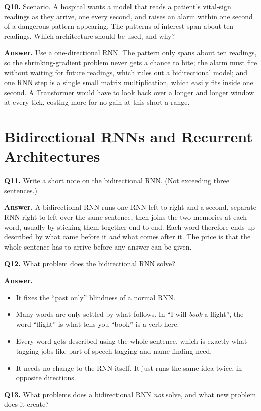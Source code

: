 \documentclass[11pt]{article}
\begin{document}
\medskip
\textbf{Q10.} Scenario. A hospital wants a model that reads a patient's vital-sign readings as
they arrive, one every second, and raises an alarm within one second of a dangerous pattern
appearing. The patterns of interest span about ten readings. Which architecture should be
used, and why?

\textbf{Answer.} Use a one-directional RNN. The pattern only spans about ten readings, so the
shrinking-gradient problem never gets a chance to bite; the alarm must fire without waiting
for future readings, which rules out a bidirectional model; and one RNN step is a single small
matrix multiplication, which easily fits inside one second. A Transformer would have to look
back over a longer and longer window at every tick, costing more for no gain at this short a
range.

\section{Bidirectional RNNs and Recurrent Architectures}

\textbf{Q11.} Write a short note on the bidirectional RNN. (Not exceeding three sentences.)

\textbf{Answer.} A bidirectional RNN runs one RNN left to right and a second, separate RNN
right to left over the same sentence, then joins the two memories at each word, usually by
sticking them together end to end. Each word therefore ends up described by what came before
it \emph{and} what comes after it. The price is that the whole sentence has to arrive before
any answer can be given.

\medskip
\textbf{Q12.} What problem does the bidirectional RNN solve?

\textbf{Answer.}
\begin{itemize}
  \item It fixes the ``past only'' blindness of a normal RNN.
  \item Many words are only settled by what follows. In ``I will \emph{book} a flight'', the word ``flight'' is what tells you ``book'' is a verb here.
  \item Every word gets described using the whole sentence, which is exactly what tagging jobs like part-of-speech tagging and name-finding need.
  \item It needs no change to the RNN itself. It just runs the same idea twice, in opposite directions.
\end{itemize}

\medskip
\textbf{Q13.} What problems does a bidirectional RNN \emph{not} solve, and what new problem
does it create?
\end{document}
